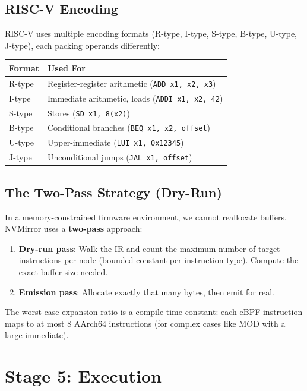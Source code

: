 \documentclass[11pt,letterpaper]{article}
\begin{document}
\subsection{RISC-V Encoding}

RISC-V uses multiple encoding formats (R-type, I-type, S-type, B-type, U-type, J-type), each packing operands differently:

\begin{center}
\begin{tabular}{lp{8cm}}
\toprule
\textbf{Format} & \textbf{Used For} \\
\midrule
R-type & Register-register arithmetic (\texttt{ADD x1, x2, x3}) \\
I-type & Immediate arithmetic, loads (\texttt{ADDI x1, x2, 42}) \\
S-type & Stores (\texttt{SD x1, 8(x2)}) \\
B-type & Conditional branches (\texttt{BEQ x1, x2, offset}) \\
U-type & Upper-immediate (\texttt{LUI x1, 0x12345}) \\
J-type & Unconditional jumps (\texttt{JAL x1, offset}) \\
\bottomrule
\end{tabular}
\end{center}

\subsection{The Two-Pass Strategy (Dry-Run)}

In a memory-constrained firmware environment, we cannot reallocate buffers. NVMirror uses a \textbf{two-pass} approach:

\begin{enumerate}
    \item \textbf{Dry-run pass}: Walk the IR and count the maximum number of target instructions per node (bounded constant per instruction type). Compute the exact buffer size needed.
    \item \textbf{Emission pass}: Allocate exactly that many bytes, then emit for real.
\end{enumerate}

The worst-case expansion ratio is a compile-time constant: each eBPF instruction maps to at most 8 AArch64 instructions (for complex cases like MOD with a large immediate).

\section{Stage 5: Execution}
\label{sec:execution}
\end{document}
